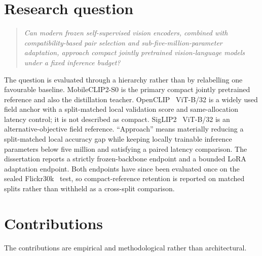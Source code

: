 \documentclass[11pt,a4paper,oneside]{report}
\begin{document}
\section{Research question}
\begin{quote}
\itshape
Can modern frozen self-supervised vision encoders, combined with compatibility-based pair selection and sub-five-million-parameter adaptation, approach compact jointly pretrained vision-language models under a fixed inference budget?
\end{quote}
The question is evaluated through a hierarchy rather than by relabelling one favourable baseline. MobileCLIP2-S0 is the primary compact jointly pretrained reference and also the distillation teacher. OpenCLIP~\cite{cherti2023scaling} ViT-B/32 is a widely used field anchor with a split-matched local validation score and same-allocation latency control; it is not described as compact. SigLIP2~\cite{tschannen2025siglip2} ViT-B/32 is an alternative-objective field reference. ``Approach'' means materially reducing a split-matched local accuracy gap while keeping locally trainable inference parameters below five million and satisfying a paired latency comparison. The dissertation reports a strictly frozen-backbone endpoint and a bounded LoRA~\cite{hu2021lora} adaptation endpoint. Both endpoints have since been evaluated once on the sealed Flickr30k~\cite{young2014flickr30k} test, so compact-reference retention is reported on matched splits rather than withheld as a cross-split comparison.

\section{Contributions}
The contributions are empirical and methodological rather than architectural.
\end{document}

